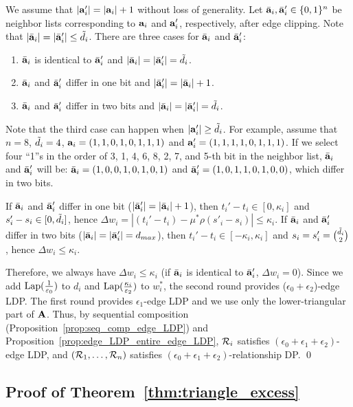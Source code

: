 {We assume that $|\mathbf{a}'_i| = |\mathbf{a}_i| + 1$ without loss of generality.
Let $\bar{\mathbf{a}}_i, \bar{\mathbf{a}}'_i \in \{0,1\}^n$ be neighbor lists corresponding to $\mathbf{a}_i$ and $\mathbf{a}'_i$, respectively, after edge clipping.
Note that $|\bar{\mathbf{a}}_i| = |\bar{\mathbf{a}}'_i| \leq \tilde{d}_i$.
There are three cases for $\bar{\mathbf{a}}_i$ and $\bar{\mathbf{a}}'_i$:
\begin{enumerate}
    \item $\bar{\mathbf{a}}_i$ is identical to $\bar{\mathbf{a}}'_i$ and $|\bar{\mathbf{a}}_i| = |\bar{\mathbf{a}}'_i| = \tilde{d}_i$.
    \item $\bar{\mathbf{a}}_i$ and $\bar{\mathbf{a}}'_i$ differ in one bit and $|\bar{\mathbf{a}}'_i| = |\bar{\mathbf{a}}_i| + 1$.
    \item $\bar{\mathbf{a}}_i$ and $\bar{\mathbf{a}}'_i$ differ in two bits and $|\bar{\mathbf{a}}_i| = |\bar{\mathbf{a}}'_i| = \tilde{d}_i$.
\end{enumerate}
Note that the third case can happen when $|\mathbf{a}'_i| \geq \tilde{d}_i$.
For example, assume that $n=8$, $\tilde{d}_i=4$, $\mathbf{a}_i=(1,1,0,1,0,1,1,1)$ and $\mathbf{a}'_i=(1,1,1,1,0,1,1,1)$.
If we select four ``1''s in the order of 3, 1, 4, 6, 8, 2, 7, and 5-th bit in the neighbor list,
$\bar{\mathbf{a}}_i$ and $\bar{\mathbf{a}}'_i$ will be:
$\bar{\mathbf{a}}_i=(1,0,0,1,0,1,0,1)$ and $\bar{\mathbf{a}}'_i=(1,0,1,1,0,1,0,0)$,
which differ in two bits.

If $\bar{\mathbf{a}}_i$ and $\bar{\mathbf{a}}'_i$ differ in one bit ($|\bar{\mathbf{a}}'_i| = |\bar{\mathbf{a}}_i| + 1$), then ${t_i}' - t_i \in [0,\kappa_i]$ and $s'_i - s_i \in [0,\tilde{d}_i]$, hence $\Delta w_i = |({t_i}' - t_i) - \mu^*\rho(s'_i - s_i)| \leq \kappa_i$.
If $\bar{\mathbf{a}}_i$ and $\bar{\mathbf{a}}'_i$ differ in two bits ($|\bar{\mathbf{a}}_i| = |\bar{\mathbf{a}}'_i| = d_{max}$), then ${t_i}' - t_i \in [-\kappa_i,\kappa_i]$ and $s_i = s'_i = \binom{\tilde{d}_i}{2}$, hence $\Delta w_i \leq \kappa_i$.

Therefore, we always have $\Delta w_i \leq \kappa_i$
(if $\bar{\mathbf{a}}_i$ is identical to $\bar{\mathbf{a}}'_i$, $\Delta w_i =0$).
Since we add $\textrm{Lap}(\frac{1}{\varepsilon_0})$
to $d_i$ and
$\textrm{Lap}(\frac{\kappa_i}{\varepsilon_2})$
to $w_i^*$, the second round provides ($\epsilon_0+\epsilon_2$)-edge LDP.
The first round provides $\epsilon_1$-edge LDP and we use only the lower-triangular part of $\mathbf{A}$.
Thus, by sequential composition (Proposition~\ref{prop:seq_comp_edge_LDP}) 
and Proposition~\ref{prop:edge_LDP_entire_edge_LDP},
$\mathcal{R}_i$ satisfies $(\epsilon_0 + \epsilon_1 + \epsilon_2)$-edge LDP, and $(\mathcal{R}_1, \ldots, \mathcal{R}_n)$ satisfies $(\epsilon_0 + \epsilon_1 + \epsilon_2)$-relationship DP.
\qed

\subsection{Proof of Theorem~\ref{thm:triangle_excess}}

}

